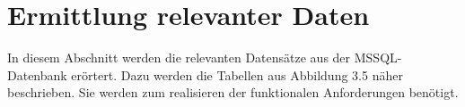 \section{Ermittlung relevanter Daten}
\label{ch:Systemanalyse:sec:Information}

In diesem Abschnitt werden die relevanten Datensätze aus der MSSQL-Datenbank erörtert. Dazu werden die Tabellen aus Abbildung 3.5 näher beschrieben. Sie werden zum realisieren der funktionalen Anforderungen  benötigt.



